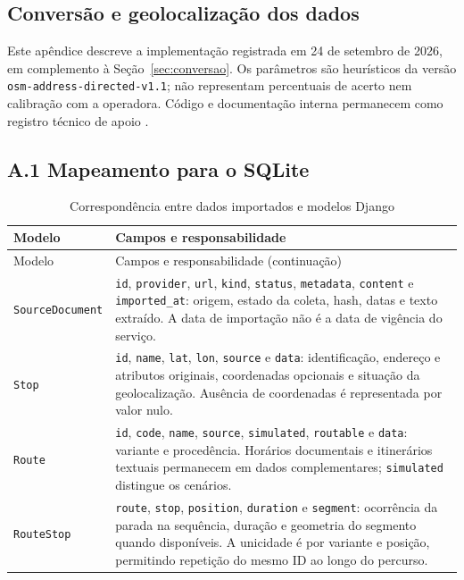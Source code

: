 \documentclass[12pt,oneside,a4paper,brazil]{abntex2}
\begin{document}
\begin{apendicesenv}
\chapter{Conversão e geolocalização dos dados}
\label{ap:importacao}
Este apêndice descreve a implementação registrada em 24 de setembro de 2026, em complemento à Seção~\ref{sec:conversao}. Os parâmetros são heurísticos da versão \nolinkurl{osm-address-directed-v1.1}; não representam percentuais de acerto nem calibração com a operadora. Código e documentação interna permanecem como registro técnico de apoio \citep{mbmimportacoes}.

\section*{A.1 Mapeamento para o SQLite}
\begingroup\small
\setlength{\tabcolsep}{4pt}
\setlength{\parskip}{0pt}
\begin{longtable}{>{\raggedright\arraybackslash}p{}>{\raggedright\arraybackslash}p{}}
\caption{Correspondência entre dados importados e modelos Django}\label{tab:modelos-importacao}\\
\hline Modelo & Campos e responsabilidade \\\hline
\endfirsthead
\hline Modelo & Campos e responsabilidade (continuação) \\\hline
\endhead
\hline\endfoot
\texttt{SourceDocument} & \texttt{id}, \texttt{provider}, \texttt{url}, \texttt{kind}, \texttt{status}, \texttt{metadata}, \texttt{content} e \texttt{imported\_at}: origem, estado da coleta, hash, datas e texto extraído. A data de importação não é a data de vigência do serviço.\\
\texttt{Stop} & \texttt{id}, \texttt{name}, \texttt{lat}, \texttt{lon}, \texttt{source} e \texttt{data}: identificação, endereço e atributos originais, coordenadas opcionais e situação da geolocalização. Ausência de coordenadas é representada por valor nulo.\\
\texttt{Route} & \texttt{id}, \texttt{code}, \texttt{name}, \texttt{source}, \texttt{simulated}, \texttt{routable} e \texttt{data}: variante e procedência. Horários documentais e itinerários textuais permanecem em dados complementares; \texttt{simulated} distingue os cenários.\\
\texttt{RouteStop} & \texttt{route}, \texttt{stop}, \texttt{position}, \texttt{duration} e \texttt{segment}: ocorrência da parada na sequência, duração e geometria do segmento quando disponíveis. A unicidade é por variante e posição, permitindo repetição do mesmo ID ao longo do percurso.\\

\end{longtable}
\end{apendicesenv}
\end{document}
